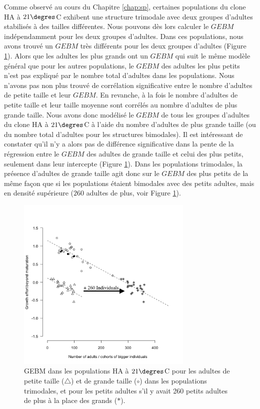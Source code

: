 Comme observé au cours du Chapitre \ref{chap:sp}, certaines populations du clone
HA à $21\degres$C exhibent une structure trimodale avec deux groupes d'adultes
stabilisés à des tailles différentes. Nous pouvons dès lors calculer le $GEBM$
indépendamment pour les deux groupes d'adultes.
Dans ces populations, nous avons trouvé un $GEBM$ très différents pour les deux
groupes d'adultes (Figure \ref{fig:FIP6}). Alors que les adultes les plus grands
ont un $GEBM$ qui suit le même modèle général que pour les autres populations,
le $GEBM$ des adultes les plus petits n'est pas expliqué par le nombre total
d'adultes dans les populations. Nous n'avons pas non plus trouvé de corrélation
significative entre le nombre d'adultes de petite taille et leur $GEBM$. En
revanche, à la fois le nombre d'adultes de petite taille et leur taille moyenne
sont corrélés au nombre d'adultes de plus grande taille. Nous avons donc
modélisé le $GEBM$ de tous les groupes d'adultes du clone HA à $21\degres$C à
l'aide du nombre d'adultes de plus grande taille (ou du nombre total d'adultes
pour les structures bimodales). Il est intéressant de constater qu'il n'y a
alors pas de différence significative dans la pente de la régression entre le
$GEBM$ des adultes de grande taille et celui des plus petits, seulement dans
leur intercepte (Figure \ref{fig:FIP6}). Dans les populations trimodales, la
présence d'adultes de grande taille agit donc sur le $GEBM$ des plus petits de
la même façon que si les populations étaient bimodales avec des petits adultes,
mais en densité supérieure ($260$ adultes de plus, voir Figure \ref{fig:FIP6}).

\begin{figure}[!ht]
\begin{center}
\includegraphics[width=0.75\textwidth]{1_CorpsDeThese/Resumes/Fig/FIP06}
\caption[GEBM dans les
populations HA à $21\degres$C]{GEBM dans les
populations HA à $21\degres$C pour les adultes de petite taille ($\triangle$) et
de grande taille ($\circ$) dans les populations trimodales, et pour les petits
adultes s'il y avait 260 petits adultes de plus à la place des grands ($\ast$).}
\label{fig:FIP6}
\end{center}
\end{figure}

